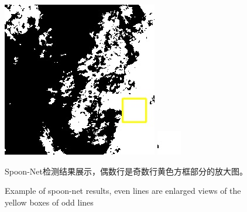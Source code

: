 \documentclass[10pt,UTF8,fntef]{ctexart}
\begin{document}
\begin{figure}[H]
{{\begin{minipage}[b]{0.15\linewidth}
            \includegraphics[width=1\linewidth]{../log/spoon3/cut/LC81570452014213LGN00_06142_qa.jpg}\vspace{4pt}
            \includegraphics[width=1\linewidth]{../log/spoon3/cut/tmp_cut_LC81570452014213LGN00_06142_qa.jpg}\vspace{4pt}
        \end{minipage}
    }
}
 
\caption{Spoon-Net检测结果展示，偶数行是奇数行黄色方框部分的放大图。}
\addtocounter{figure}{-1}
\vspace{-5pt}
\renewcommand{\figurename}{Fig}
\caption{Example of spoon-net results, even lines are enlarged views of the yellow boxes of odd lines}
\renewcommand{\figurename}{图}
\label{Fig.main1}
\end{figure}
\end{document}
